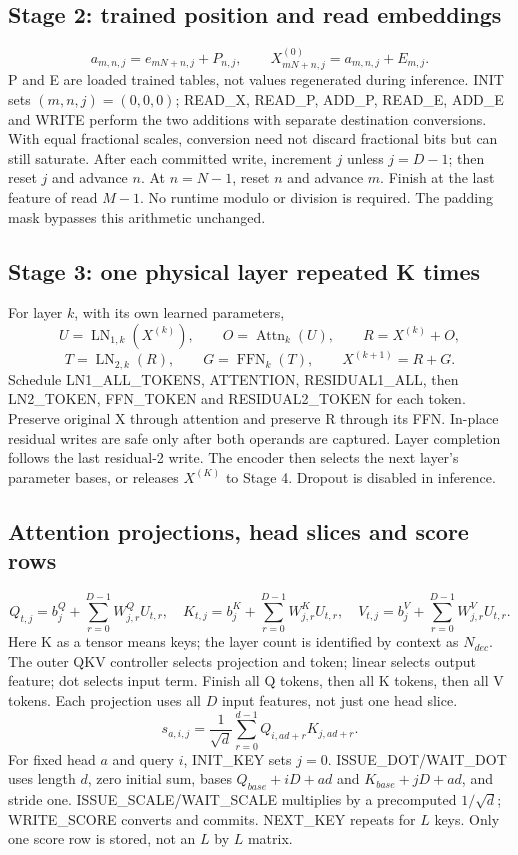 \subsection{Stage 2: trained position and read embeddings}
\[
a_{m,n,j}=e_{mN+n,j}+P_{n,j},\qquad
X^{(0)}_{mN+n,j}=a_{m,n,j}+E_{m,j}.
\]
P and E are loaded trained tables, not values regenerated during inference. INIT sets $(m,n,j)=(0,0,0)$; READ\_X, READ\_P, ADD\_P, READ\_E, ADD\_E and WRITE perform the two additions with separate destination conversions. With equal fractional scales, conversion need not discard fractional bits but can still saturate.
After each committed write, increment $j$ unless $j=D-1$; then reset $j$ and advance $n$. At $n=N-1$, reset $n$ and advance $m$. Finish at the last feature of read $M-1$. No runtime modulo or division is required. The padding mask bypasses this arithmetic unchanged.

\subsection{Stage 3: one physical layer repeated K times}
For layer $k$, with its own learned parameters,
\[
U=\operatorname{LN}_{1,k}(X^{(k)}),\qquad O=\operatorname{Attn}_{k}(U),\qquad R=X^{(k)}+O,
\]
\[
T=\operatorname{LN}_{2,k}(R),\qquad G=\operatorname{FFN}_{k}(T),\qquad X^{(k+1)}=R+G.
\]
Schedule LN1\_ALL\_TOKENS, ATTENTION, RESIDUAL1\_ALL, then LN2\_TOKEN, FFN\_TOKEN and RESIDUAL2\_TOKEN for each token. Preserve original X through attention and preserve R through its FFN. In-place residual writes are safe only after both operands are captured. Layer completion follows the last residual-2 write. The encoder then selects the next layer's parameter bases, or releases $X^{(K)}$ to Stage 4. Dropout is disabled in inference.

\subsection{Attention projections, head slices and score rows}
\[
Q_{t,j}=b^Q_j+\sum_{r=0}^{D-1}W^Q_{j,r}U_{t,r},\quad
K_{t,j}=b^K_j+\sum_{r=0}^{D-1}W^K_{j,r}U_{t,r},\quad
V_{t,j}=b^V_j+\sum_{r=0}^{D-1}W^V_{j,r}U_{t,r}.
\]
Here K as a tensor means keys; the layer count is identified by context as $N_{dec}$. The outer QKV controller selects projection and token; linear selects output feature; dot selects input term. Finish all Q tokens, then all K tokens, then all V tokens. Each projection uses all $D$ input features, not just one head slice.
\[
s_{a,i,j}=\frac{1}{\sqrt d}\sum_{r=0}^{d-1}Q_{i,ad+r}K_{j,ad+r}.
\]
For fixed head $a$ and query $i$, INIT\_KEY sets $j=0$. ISSUE\_DOT/WAIT\_DOT uses length $d$, zero initial sum, bases $Q_{base}+iD+ad$ and $K_{base}+jD+ad$, and stride one. ISSUE\_SCALE/WAIT\_SCALE multiplies by a precomputed $1/\sqrt d$; WRITE\_SCORE converts and commits. NEXT\_KEY repeats for $L$ keys. Only one score row is stored, not an $L$ by $L$ matrix.

